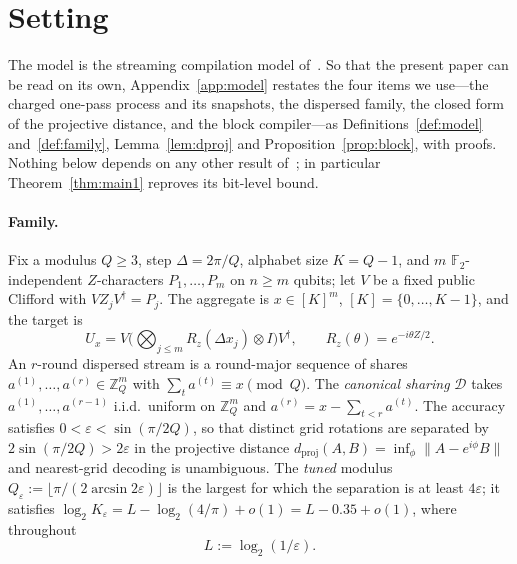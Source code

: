 \documentclass[aps,prx,twocolumn,superscriptaddress,nofootinbib,longbibliography]{revtex4-2}
\theoremstyle{plain}
\theoremstyle{definition}
\theoremstyle{remark}
\newcommand{\dproj}{d_{\mathrm{proj}}}
\newcommand{\Z}{\mathbb{Z}}
\newcommand{\F}{\mathbb{F}}
\begin{document}
\section{Setting}\label{sec:setting}

The model is the streaming compilation model of~\cite{Paper1}. So that the present paper can be read on its own, Appendix~\ref{app:model} restates the four items we use---the charged one-pass process and its snapshots, the dispersed family, the closed form of the projective distance, and the block compiler---as Definitions~\ref{def:model} and~\ref{def:family}, Lemma~\ref{lem:dproj} and Proposition~\ref{prop:block}, with proofs. Nothing below depends on any other result of~\cite{Paper1}; in particular Theorem~\ref{thm:main1} reproves its bit-level bound.

\paragraph{Family.} Fix a modulus $Q\ge3$, step $\Delta=2\pi/Q$, alphabet size $K=Q-1$, and $m$ $\F_2$-independent $Z$-characters $P_1,\dots,P_m$ on $n\ge m$ qubits; let $V$ be a fixed public Clifford with $VZ_jV^\dagger=P_j$. The aggregate is $x\in[K]^m$, $[K]=\{0,\dots,K-1\}$, and the target is
\begin{equation}
U_x=V\Big(\bigotimes_{j\le m}R_z(\Delta x_j)\otimes I\Big)V^\dagger,\qquad R_z(\theta)=e^{-i\theta Z/2}.
\end{equation}
An $r$-round dispersed stream is a round-major sequence of shares $a^{(1)},\dots,a^{(r)}\in\Z_Q^m$ with $\sum_ta^{(t)}\equiv x\pmod Q$. The \emph{canonical sharing} $\mathcal D$ takes $a^{(1)},\dots,a^{(r-1)}$ i.i.d.\ uniform on $\Z_Q^m$ and $a^{(r)}=x-\sum_{t<r}a^{(t)}$. The accuracy satisfies $0<\varepsilon<\sin(\pi/2Q)$, so that distinct grid rotations are separated by $2\sin(\pi/2Q)>2\varepsilon$ in the projective distance $\dproj(A,B)=\inf_\phi\|A-e^{i\phi}B\|$ and nearest-grid decoding is unambiguous. The \emph{tuned} modulus $Q_\varepsilon:=\lfloor\pi/(2\arcsin2\varepsilon)\rfloor$ is the largest for which the separation is at least $4\varepsilon$; it satisfies $\log_2K_\varepsilon=L-\log_2(4/\pi)+o(1)=L-0.35+o(1)$, where throughout
\begin{equation}
L:=\log_2(1/\varepsilon).
\end{equation}
\end{document}
